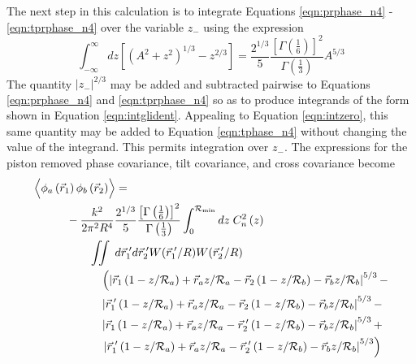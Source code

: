 The next step in this calculation is to integrate Equations
\ref{eqn:prphase_n4} - \ref{eqn:tprphase_n4} over the variable $z_{-}$
using the expression 
\begin{equation}\label{eqn:intglident}
\int_{-\infty}^{\infty} dz\left[\left(A^{2} + z^{2}\right)^{1/3} - z^{2/3}\right] = 
\frac{2^{1/3}}{5}\frac{\left[\Gamma\left(\frac{1}{6}\right)\right]^{2}}{\Gamma\left(\frac{1}{3}\right)} A^{5/3}
\end{equation}
The quantity $\left\vert z_{-}\right\vert^{2/3}$ may be added and
subtracted pairwise to Equations \ref{eqn:prphase_n4} and
\ref{eqn:tprphase_n4} so as to produce integrands of the form shown in
Equation \ref{eqn:intglident}.  Appealing to Equation \ref{eqn:intzero}, this
same quantity may be added to Equation \ref{eqn:tphase_n4} without
changing the value of the integrand.  This permits integration over
$z_{-}$. The expressions for the piston removed
phase covariance, tilt covariance, and cross covariance become
\begin{equation}\label{eqn:prphase_n5}
\begin{aligned}
&\left\langle \vphantom{\hat{\phi}_{a}} \phi_{a}\left(\vec{r}_{1}\right) \phi_{b}\left(\vec{r}_{2}\right)\right\rangle = \\
&\quad\quad\quad
-\frac{k^{2}}{2\pi^{2}R^{4}} 
\frac{2^{1/3}}{5}\frac{\left[\Gamma\left(\frac{1}{6}\right)\right]^{2}}{\Gamma\left(\frac{1}{3}\right)} 
\int_{0}^{\mathcal{R}_{\rm min}} dz\;C_{n}^{2}\left(z\right) \\
&\quad\quad\quad\quad\quad
\iint \; d\vec{r}^{\;\prime}_{1}d\vec{r}^{\;\prime}_{2}  
W(\vec{r}^{\;\prime}_{1}/R) W(\vec{r}^{\;\prime}_{2}/R) \\
&\quad\quad\quad\quad\quad\quad
\left(
\left\vert \vec{r}_{1}\left(1-z/\mathcal{R}_{a}\right) + \vec{r}_{a} z/\mathcal{R}_{a} - 
\vec{r}_{2}\left(1-z/\mathcal{R}_{b}\right) - \vec{r}_{b} z/\mathcal{R}_{b}\right\vert^{5/3} -
\right. \\
& \quad\quad\quad\quad\quad\quad
\left\vert \vec{r}^{\;\prime}_{1}\left(1-z/\mathcal{R}_{a}\right) + \vec{r}_{a} z/\mathcal{R}_{a} - 
\vec{r}_{2}\left(1-z/\mathcal{R}_{b}\right) - \vec{r}_{b} z/\mathcal{R}_{b}\right\vert^{5/3} - \\
& \quad\quad\quad\quad\quad\quad
\left\vert \vec{r}_{1}\left(1-z/\mathcal{R}_{a}\right) + \vec{r}_{a} z/\mathcal{R}_{a} - 
\vec{r}^{\;\prime}_{2}\left(1-z/\mathcal{R}_{b}\right) - \vec{r}_{b} z/\mathcal{R}_{b}\right\vert^{5/3} + \\
& \quad\quad\quad\quad\quad\quad
\left.
\left\vert \vec{r}^{\;\prime}_{1}\left(1-z/\mathcal{R}_{a}\right) + \vec{r}_{a} z/\mathcal{R}_{a} - 
\vec{r}^{\;\prime}_{2}\left(1-z/\mathcal{R}_{b}\right) - \vec{r}_{b} z/\mathcal{R}_{b}\right\vert^{5/3}\right)
\end{aligned}
\end{equation}

